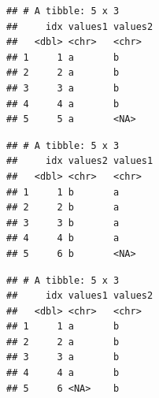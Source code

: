 \documentclass[krantz2]{krantz}\usepackage{knitr}%
\begin{document}
\begin{knitrout}\footnotesize
{}\color{fgcolor}\begin{kframe}
\begin{alltt}
\hlstd{(}   
\end{alltt}


{\ttfamily\noindent\itshape{}}\begin{verbatim}
## # A tibble: 5 x 3
##     idx values1 values2
##   <dbl> <chr>   <chr>  
## 1     1 a       b      
## 2     2 a       b      
## 3     3 a       b      
## 4     4 a       b      
## 5     5 a       <NA>
\end{verbatim}
\end{kframe}
\end{knitrout}

\begin{knitrout}\footnotesize
{}\color{fgcolor}\begin{kframe}
\begin{alltt}
\hlstd{(}   
\end{alltt}


{\ttfamily\noindent\itshape{}}\begin{verbatim}
## # A tibble: 5 x 3
##     idx values2 values1
##   <dbl> <chr>   <chr>  
## 1     1 b       a      
## 2     2 b       a      
## 3     3 b       a      
## 4     4 b       a      
## 5     6 b       <NA>
\end{verbatim}
\end{kframe}
\end{knitrout}

\begin{knitrout}\footnotesize
{}\color{fgcolor}\begin{kframe}
\begin{alltt}
\hlstd{(}   
\end{alltt}


{\ttfamily\noindent\itshape{}}\begin{verbatim}
## # A tibble: 5 x 3
##     idx values1 values2
##   <dbl> <chr>   <chr>  
## 1     1 a       b      
## 2     2 a       b      
## 3     3 a       b      
## 4     4 a       b      
## 5     6 <NA>    b
\end{verbatim}
\end{kframe}
\end{knitrout}
\end{document}
